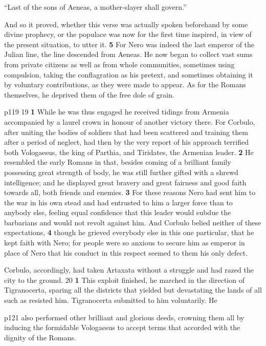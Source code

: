``Last of the sons of Aeneas, a mother-slayer shall govern.''

And so it proved, whether this verse was actually spoken beforehand by some divine prophecy, or the populace was now for the first time inspired, in view of the present situation, to utter it. \textbf{5} For Nero was indeed the last emperor of the Julian line, the line descended from Aeneas. He now began to collect vast sums from private citizens as well as from whole communities, sometimes using compulsion, taking the conflagration as his pretext, and sometimes obtaining it by voluntary contributions, as they were made to appear. As for the Romans themselves, he deprived them of the free dole of grain.

p119
19
\textbf{1} While he was thus engaged he received tidings from Armenia accompanied by a laurel crown in honour of another victory there. For Corbulo, after uniting the bodies of soldiers that had been scattered and training them after a period of neglect, had then by the very report of his approach terrified both Vologaesus, the king of Parthia, and Tiridates, the Armenian leader. \textbf{2} He resembled the early Romans in that, besides coming of a brilliant family possessing great strength of body, he was still further gifted with a shrewd intelligence; and he displayed great bravery and great fairness and good faith towards all, both friends and enemies. \textbf{3} For these reasons Nero had sent him to the war in his own stead and had entrusted to him a larger force than to anybody else, feeling equal confidence that this leader would subdue the barbarians and would not revolt against him. And Corbulo belied neither of these expectations, \textbf{4} though he grieved everybody else in this one particular, that he kept faith with Nero; for people were so anxious to secure him as emperor in place of Nero that his conduct in this respect seemed to them his only defect.

Corbulo, accordingly, had taken Artaxata without a struggle and had razed the city to the ground.
20
\textbf{1} This exploit finished, he marched in the direction of Tigranocerta, sparing all the districts that yielded but devastating the lands of all such as resisted him. Tigranocerta submitted to him voluntarily. He

p121 also performed other brilliant and glorious deeds, crowning them all by indu­cing the formidable Vologaesus to accept terms that accorded with the dignity of the Romans.

